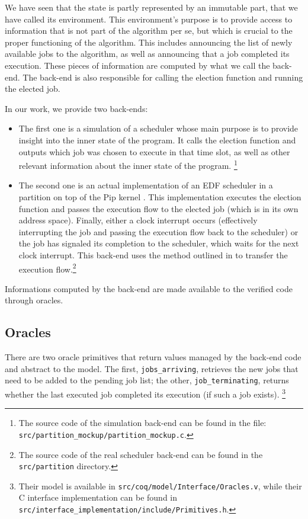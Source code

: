 	We have seen that the state is partly represented by an immutable part, that we have called its environment. This environment's purpose is to provide access to information that is not part of the algorithm per se, but which is crucial to the proper functioning of the algorithm. This includes announcing the list of newly available jobs to the algorithm, as well as announcing that a job completed its execution. These pieces of information are computed by what we call the back-end. The back-end is also responsible for calling the election function and running the elected job.

	In our work, we provide two back-ends:
	\begin{itemize}
	    \item The first one  is a simulation of a scheduler whose main purpose is to provide insight into the inner state of the program. It calls the election function and outputs which job was chosen to execute in that time slot, as well as other relevant information about the inner state of the program. \footnote{The source code of the simulation back-end can be found in the file:\\ \texttt{src/partition\_mockup/partition\_mockup.c}.}
	    \item The second one is an actual implementation of an EDF scheduler in a partition on top of the Pip kernel \cite{jomaa2018proof}. This implementation executes the election function and passes the execution flow to the elected job (which is in its own address space). Finally, either a clock interrupt occurs (effectively interrupting the job and passing the execution flow back to the scheduler) or the job has signaled its completion to the scheduler, which waits for the next clock interrupt. This back-end uses the method outlined in \cite{vanhems2019proof} to transfer the execution flow.\footnote{The source code of the real scheduler back-end can be found in the \texttt{src/partition} directory.}
	\end{itemize}

	Informations computed by the back-end are made available to the verified code through oracles.

	\subsection{Oracles}

	There are two oracle primitives that return values managed by the back-end code and abstract to the model. The first, \texttt{jobs\_arriving}, retrieves the new jobs that need to be added to the pending job list; the other, \texttt{job\_terminating}, returns whether the last executed job completed its execution (if such a job exists). \footnote{Their model is available in \texttt{src/coq/model/Interface/Oracles.v}, while their C interface implementation can be found in \texttt{src/interface\_implementation/include/Primitives.h}.}

